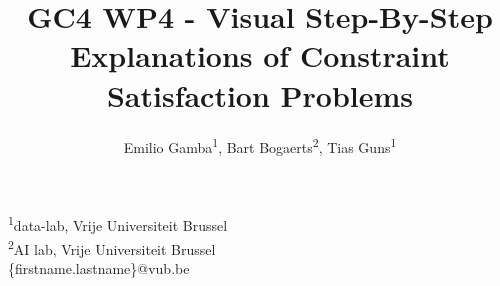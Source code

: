 \documentclass{beamer}
\title{GC4 WP4 - Visual Step-By-Step Explanations of Constraint Satisfaction Problems}
\author{Emilio Gamba\textsuperscript{1}, Bart Bogaerts\textsuperscript{2}, Tias Guns\textsuperscript{1}}
\date{}
\begin{document}

\begin{frame}
    \maketitle
    \begin{center}
        
    \end{center}
    \tiny{\textsuperscript{1}data-lab, Vrije Universiteit Brussel}\\
    \tiny{\textsuperscript{2}AI lab, Vrije Universiteit Brussel}\\
    \tiny{\{firstname.lastname\}@vub.be}


\end{frame}
\end{document}
